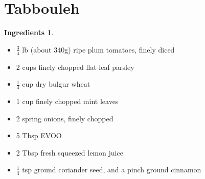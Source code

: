 \documentclass[a4paper,12pt]{scrreprt}
\theoremstyle{definition}
\newtheorem*{ingredients}{Ingredients}
\theoremstyle{plain}
\theoremstyle{remark}
\begin{document}
\section{Tabbouleh}

\begin{ingredients}
  $\,$
  \begin{multicols}{2}
    \begin{itemize}
      \item $\frac{3}{4}$ lb (about 340g) ripe plum tomatoes, finely diced

      \item 2 cups finely chopped flat-leaf parsley

      \item $\frac{1}{4}$ cup dry bulgur wheat

      \item 1 cup finely chopped mint leaves

      \item 2 spring onions, finely chopped

      \item 5 Tbsp EVOO

      \item 2 Tbsp fresh squeezed lemon juice

      \item $\frac{1}{4}$ tsp ground coriander seed, and a pinch ground cinnamon
    \end{itemize}
  \end{multicols}
\end{ingredients}
\end{document}
